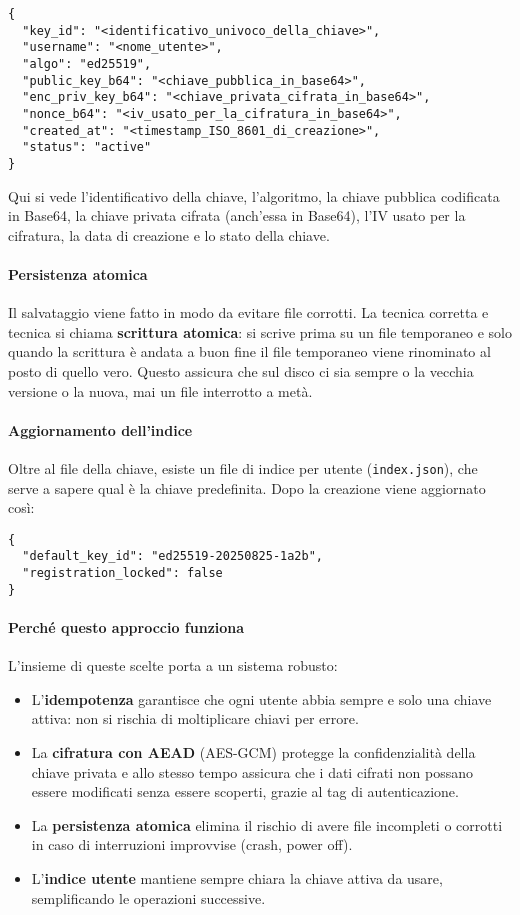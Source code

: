 \begin{verbatim}
{
  "key_id": "<identificativo_univoco_della_chiave>",
  "username": "<nome_utente>",
  "algo": "ed25519",
  "public_key_b64": "<chiave_pubblica_in_base64>",
  "enc_priv_key_b64": "<chiave_privata_cifrata_in_base64>",
  "nonce_b64": "<iv_usato_per_la_cifratura_in_base64>",
  "created_at": "<timestamp_ISO_8601_di_creazione>",
  "status": "active"
}
\end{verbatim}

Qui si vede l’identificativo della chiave, l’algoritmo, la chiave pubblica codificata in Base64, la chiave privata cifrata (anch’essa in Base64), l’IV usato per la cifratura, la data di creazione e lo stato della chiave.

\paragraph{Persistenza atomica}
Il salvataggio viene fatto in modo da evitare file corrotti. La tecnica corretta e tecnica si chiama \textbf{scrittura atomica}: si scrive prima su un file temporaneo e solo quando la scrittura è andata a buon fine il file temporaneo viene rinominato al posto di quello vero. Questo assicura che sul disco ci sia sempre o la vecchia versione o la nuova, mai un file interrotto a metà.

\paragraph{Aggiornamento dell’indice}
Oltre al file della chiave, esiste un file di indice per utente (\texttt{index.json}), che serve a sapere qual è la chiave predefinita. Dopo la creazione viene aggiornato così:

\begin{verbatim}
{
  "default_key_id": "ed25519-20250825-1a2b",
  "registration_locked": false
}
\end{verbatim}

\paragraph{Perché questo approccio funziona}
L’insieme di queste scelte porta a un sistema robusto:
\begin{itemize}
  \item L’\textbf{idempotenza} garantisce che ogni utente abbia sempre e solo una chiave attiva: non si rischia di moltiplicare chiavi per errore.
  \item La \textbf{cifratura con AEAD} (AES-GCM) protegge la confidenzialità della chiave privata e allo stesso tempo assicura che i dati cifrati non possano essere modificati senza essere scoperti, grazie al tag di autenticazione.
  \item La \textbf{persistenza atomica} elimina il rischio di avere file incompleti o corrotti in caso di interruzioni improvvise (crash, power off).
  \item L’\textbf{indice utente} mantiene sempre chiara la chiave attiva da usare, semplificando le operazioni successive.
\end{itemize}

